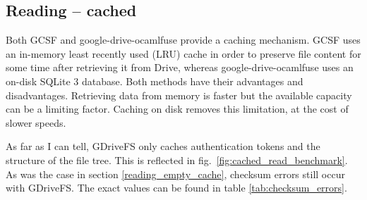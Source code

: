 \begin{table}[h]
\caption{Checksum errors reported when reading from GDriveFS} \label{tab:checksum_errors}
\end{table}

\subsection{Reading -- cached}

Both GCSF and google-drive-ocamlfuse provide a caching mechanism. GCSF uses an in-memory least recently used (LRU) cache in order to preserve file content for some time after retrieving it from Drive, whereas google-drive-ocamlfuse uses an on-disk SQLite 3 database. Both methods have their advantages and disadvantages. Retrieving data from memory is faster but the available capacity can be a limiting factor. Caching on disk removes this limitation, at the cost of slower speeds.

As far as I can tell, GDriveFS only caches authentication tokens and the structure of the file tree. This is reflected in fig.~\ref{fig:cached_read_benchmark}. As was the case in section \ref{reading_empty_cache}, checksum errors still occur with GDriveFS. The exact values can be found in table \ref{tab:checksum_errors}.

